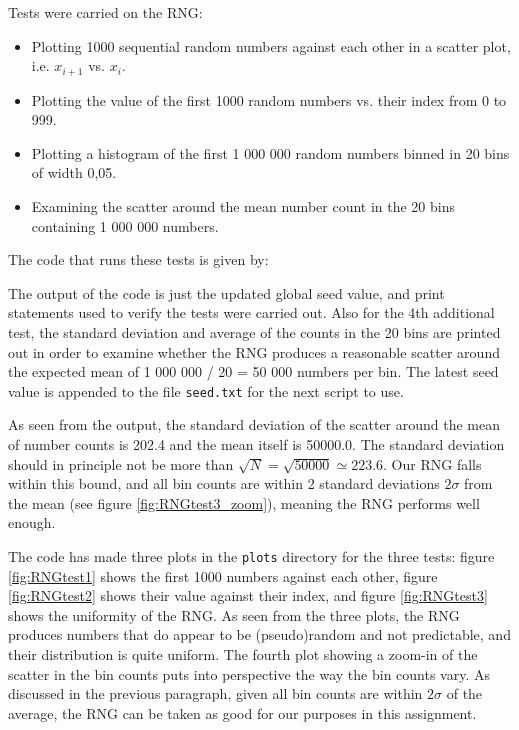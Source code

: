 \documentclass{article}
\begin{document}
Tests were carried on the RNG:
\begin{itemize}
    \item Plotting 1000 sequential random numbers against each other in a scatter plot, i.e. $x_{i+1}$ vs. $x_i$.
    \item Plotting the value of the first 1000 random numbers vs. their index from 0 to 999.
    \item Plotting a histogram of the first 1 000 000 random numbers binned in 20 bins of width 0,05.
    \item Examining the scatter around the mean number count in the 20 bins containing 1 000 000 numbers.
\end{itemize}

The code that runs these tests is given by:


The output of the code is just the updated global seed value, and print statements used to verify the tests were carried out. Also for the 4th additional test, the standard deviation and average of the counts in the 20 bins are printed out in order to examine whether the RNG produces a reasonable scatter around the expected mean of 1 000 000 / 20 = 50 000 numbers per bin. The latest seed value is appended to the file \verb+seed.txt+ for the next script to use. 



As seen from the output, the standard deviation of the scatter around the mean of number counts is 202.4 and the mean itself is 50000.0. The standard deviation should in principle not be more than $\sqrt{N} = \sqrt{50000} \simeq 223.6$. Our RNG falls within this bound, and all bin counts are within 2 standard deviations $2\sigma$ from the mean (see figure \ref{fig:RNGtest3_zoom}), meaning the RNG performs well enough. 

The code has made three plots in the \verb+plots+ directory for the three tests: figure \ref{fig:RNGtest1} shows the first 1000 numbers against each other, figure \ref{fig:RNGtest2} shows their value against their index, and figure \ref{fig:RNGtest3} shows the uniformity of the RNG. As seen from the three plots, the RNG produces numbers that do appear to be (pseudo)random and not predictable, and their distribution is quite uniform. The fourth plot showing a zoom-in of the scatter in the bin counts puts into perspective the way the bin counts vary. As discussed in the previous paragraph, given all bin counts are within $2\sigma$ of the average, the RNG can be taken as good for our purposes in this assignment.
\end{document}
